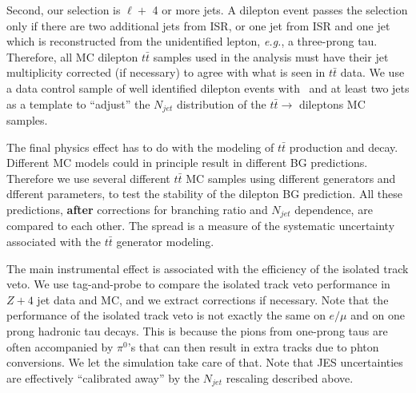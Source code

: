 Second, our selection is $\ell +$ 4 or more jets.  A dilepton event passes the selection only if there are 
two additional jets from ISR, or one jet from ISR and one jet which is reconstructed from the 
unidentified lepton, {\it e.g.}, a three-prong tau.  Therefore, all MC dilepton $t\bar{t}$ samples used
in the analysis must have their jet multiplicity corrected (if necessary) to agree with what is 
seen in $t\bar{t}$ data.  We use a data control sample of well identified dilepton events with
\met\ and at least two jets as a template to ``adjust'' the $N_{jet}$ distribution of the $t\bar{t} \to$
dileptons MC samples.

The final physics effect has to do with the modeling of $t\bar{t}$ production and decay.  Different
MC models could in principle result in different BG predictions.  Therefore we use several different 
$t\bar{t}$ MC samples using different generators and dfferent parameters, to test the stability
of the dilepton BG prediction.  All these predictions, {\bf after} corrections for branching ratio
and $N_{jet}$ dependence, are compared to each other.  The spread is a measure of the systematic
uncertainty associated with the $t\bar{t}$ generator modeling.

The main instrumental effect is associated with the efficiency of the isolated track veto.
We use tag-and-probe to compare the isolated track veto performance in $Z + 4$ jet data and 
MC, and we extract corrections if necessary.  Note that the performance of the isolated track veto 
is not exactly the same on $e/\mu$ and on one prong hadronic tau decays.  This is because
the pions from one-prong taus are often accompanied by $\pi^0$'s that can then result in extra 
tracks due to phton conversions.  We let the simulation take care of that.  
Note that JES uncertainties are effectively ``calibrated away'' by the $N_{jet}$ rescaling described above.  




